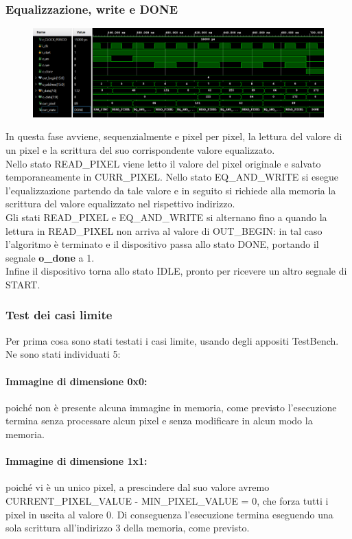 \documentclass[a4paper, 12pt]{article}
\begin{document}
\subsubsection*{Equalizzazione, write e DONE}
\begin{figure}[h]
    \centering
    \includegraphics[trim=0cm 1.25cm 0cm 0.25cm, width=1\textwidth]{simulazioni/2x2_EWD.png}
    \label{fig:2x2_EWD}
\end{figure}
In questa fase avviene, sequenzialmente e pixel per pixel, la lettura del valore di un pixel e la scrittura del suo corrispondente valore equalizzato. \\
Nello stato READ\_PIXEL viene letto il valore del pixel originale e salvato temporaneamente in CURR\_PIXEL. Nello stato EQ\_AND\_WRITE si esegue l'equalizzazione partendo da tale valore e in seguito si richiede alla memoria la scrittura del valore equalizzato nel rispettivo indirizzo. \\
Gli stati READ\_PIXEL e EQ\_AND\_WRITE si alternano fino a quando la lettura in READ\_PIXEL non arriva al valore di OUT\_BEGIN: in tal caso l'algoritmo è terminato e il dispositivo passa allo stato DONE, portando il segnale \textbf{o\_done} a 1. \\
Infine il dispositivo torna allo stato IDLE, pronto per ricevere un altro segnale di START.

\bigskip
\subsubsection{Test dei casi limite}
Per prima cosa sono stati testati i casi limite, usando degli appositi TestBench.\\
Ne sono stati individuati 5:
\paragraph*{Immagine di dimensione 0x0:}
poiché non è presente alcuna immagine in memoria, come previsto l'esecuzione termina senza processare alcun pixel e senza modificare in alcun modo la memoria.
\paragraph*{Immagine di dimensione 1x1:}
poiché vi è un unico pixel, a prescindere dal suo valore avremo CURRENT\_PIXEL\_VALUE - MIN\_PIXEL\_VALUE = 0, che forza tutti i pixel in uscita al valore 0. Di conseguenza l'esecuzione termina eseguendo una sola scrittura all'indirizzo 3 della memoria, come previsto.
\end{document}
